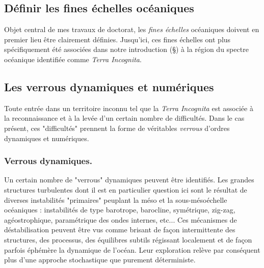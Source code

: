 \subsection{Définir les fines échelles océaniques}
Objet central de mes travaux de doctorat, les \textit{fines échelles} océaniques doivent en premier lieu être clairement définies. Jusqu'ici, ces fines échelles ont plus spécifiquement été associées dans notre introduction (\S {}) à la région du spectre océanique identifiée comme \textit{Terra Incognita}.\\

\noindent{}

\subsection{Les verrous dynamiques et numériques}
\label{subsection_verrous}


Toute entrée dans un territoire inconnu tel que la \textit{Terra Incognita} est associée à la reconnaissance et à la levée d'un certain nombre de difficultés. Dans le cas présent, ces "difficultés" prennent la forme de véritables \textit{verrous} d'ordres dynamiques et numériques.

\subsubsection{Verrous dynamiques.}
Un certain nombre de "verrous" dynamiques peuvent être identifiés. Les grandes structures turbulentes dont il est en particulier question ici sont le résultat de diverses instabilités "primaires" peuplant la méso et la sous-mésoéchelle océaniques : instabilités de type barotrope, barocline, symétrique, zig-zag, agéostrophique, paramétrique des ondes internes, etc... Ces mécanismes de déstabilisation peuvent être vus comme brisant de façon intermittente des structures, des processus, des équilibres subtils régissant localement et de façon parfois éphémère la dynamique de l'océan. Leur exploration relève par conséquent plus d'une approche stochastique que purement déterministe.

